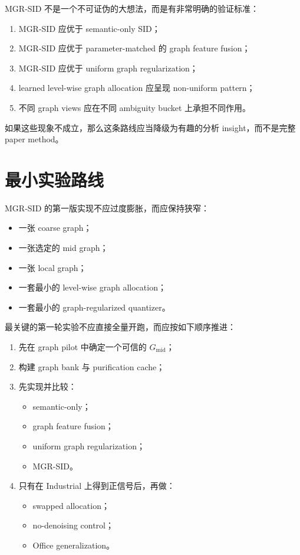 \documentclass[11pt]{article}
\begin{document}
MGR-SID 不是一个不可证伪的大想法，而是有非常明确的验证标准：
\begin{enumerate}
  \item MGR-SID 应优于 semantic-only SID；
  \item MGR-SID 应优于 parameter-matched 的 graph feature fusion；
  \item MGR-SID 应优于 uniform graph regularization；
  \item learned level-wise graph allocation 应呈现 non-uniform pattern；
  \item 不同 graph views 应在不同 ambiguity bucket 上承担不同作用。
\end{enumerate}

如果这些现象不成立，那么这条路线应当降级为有趣的分析 insight，而不是完整 paper method。

\section{最小实验路线}

MGR-SID 的第一版实现不应过度膨胀，而应保持狭窄：
\begin{itemize}
  \item 一张 coarse graph；
  \item 一张选定的 mid graph；
  \item 一张 local graph；
  \item 一套最小的 level-wise graph allocation；
  \item 一套最小的 graph-regularized quantizer。
\end{itemize}

最关键的第一轮实验不应直接全量开跑，而应按如下顺序推进：
\begin{enumerate}
  \item 先在 graph pilot 中确定一个可信的 $G_{\text{mid}}$；
  \item 构建 graph bank 与 purification cache；
  \item 先实现并比较：
  \begin{itemize}
    \item semantic-only；
    \item graph feature fusion；
    \item uniform graph regularization；
    \item MGR-SID。
  \end{itemize}
  \item 只有在 Industrial 上得到正信号后，再做：
  \begin{itemize}
    \item swapped allocation；
    \item no-denoising control；
    \item Office generalization。
  \end{itemize}
\end{enumerate}
\end{document}
